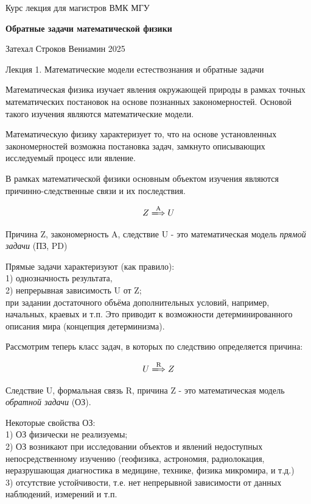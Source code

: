 \documentclass{article}
\begin{document}
\centerline{\large Курс лекция для магистров ВМК МГУ}
\centerline {\textbf{\LARGE Обратные задачи математической физики}}
\centerline {Затехал Строков Вениамин 2025}

\vspace{0.4cm}

\centerline{\LARGE Лекция 1. Математические модели естествознания и обратные задачи}

\vspace{1cm}

Математическая физика изучает явления окружающей природы в рамках точных математических постановок на основе познанных закономерностей.
Основой такого изучения являются математические модели.

Математическую физику характеризует то, что на основе установленных закономерностей возможна постановка задач, замкнуто описывающих исследуемый процесс или явление.

В рамках математической физики основным объектом изучения являются причинно-следственные связи и их последствия.

$$ Z \xLongrightarrow{\text{A}} U $$

Причина Z, закономерность A, следствие U - это математическая модель \textit{прямой задачи} (ПЗ, PD)

Прямые задачи характеризуют (как правило):\\
1) однозначность результата,\\
2) непрерывная зависимость U от Z;\\
при задании достаточного объёма дополнительных условий, например, начальных, краевых и т.п. Это приводит к возможности детерминированного описания мира (концепция детерминизма).

\bigskip

Рассмотрим теперь класс задач, в которых по следствию определяется причина:

$$ U \xLongrightarrow{\text{R}} Z $$

Следствие U, формальная связь R, причина Z - это математическая модель \textit{обратной задачи} (ОЗ).

Некоторые свойства ОЗ:\\
1) ОЗ физически не реализуемы;\\
2) ОЗ возникают при исследовании объектов и явлений недоступных непосредственному изучению (геофизика, астрономия, радиолокация, неразрушающая диагностика в медицине, технике, физика микромира, и т.д.)\\
3) отсутствие устойчивости, т.е. нет непрерывной зависимости от данных наблюдений, измерений и т.п.
\end{document}
